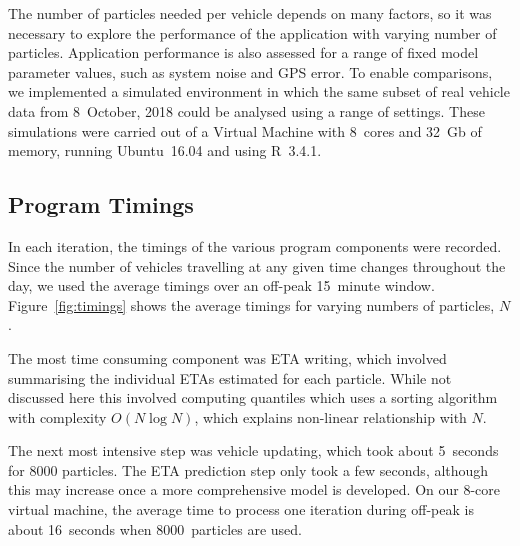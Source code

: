 The number of particles needed per vehicle 
depends on many factors,
so it was necessary to explore the performance of the application
with varying number of particles.
Application performance is also assessed
for a range of fixed model parameter values,
such as system noise and GPS error.
To enable comparisons, we implemented a simulated \rt environment
in which the same subset of real vehicle data from 8~October, 2018
could be analysed using a range of settings.
These simulations were carried out of a Virtual Machine 
with 8~cores and 32~Gb of memory, 
running Ubuntu~16.04 and using R~3.4.1.


\subsection{Program Timings}
\label{sec:timings}

In each iteration, 
the timings of the various program components were recorded.
Since the number of vehicles travelling at any given time changes throughout the day,
we used the average timings over an off-peak 15~minute window.
Figure~\ref{fig:timings} shows the average timings for 
varying numbers of particles, $N$.


The most time consuming component was ETA writing,
which involved summarising the individual ETAs estimated for each particle.
While not discussed here this involved computing quantiles which uses a sorting algorithm
with complexity $O(N \log N)$,
which explains non-linear relationship with $N$.


The next most intensive step was vehicle updating,
which took about 5~seconds for 8000 particles.
The ETA prediction step only took a few seconds,
although this may increase once a more comprehensive model is developed.
On our 8-core virtual machine,
the average time to process one iteration during off-peak is about 16~seconds
when 8000~particles are used.


